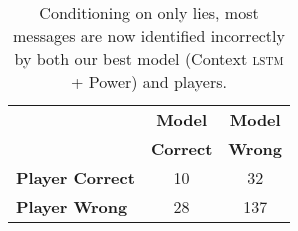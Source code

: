 



\begin{table}[t]
	\centering
	\begin{tabular}{lcc}
		& {\bf Model} & {\bf Model} \\
		& {\bf Correct} & {\bf Wrong} \\
		\toprule
		{\bf Player Correct} & 10 & 32 \\
		{\bf Player Wrong} & 28 & 137 \\
		\bottomrule
	\end{tabular}
	\caption{Conditioning on only lies, most messages are now identified incorrectly by both our best model (Context \textsc{lstm} + Power) and players.} 
	\label{tab:playermodelcomparisonoflies}
\end{table}


